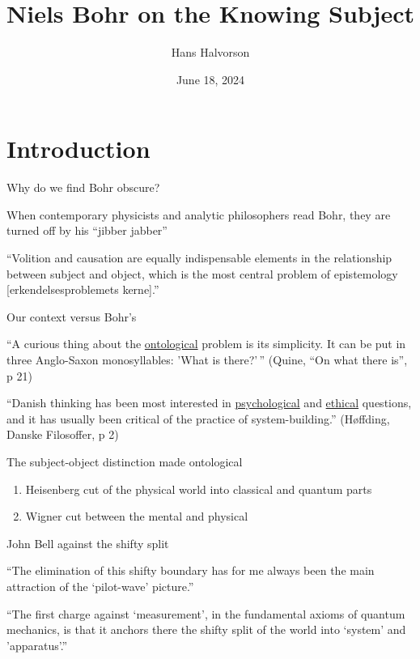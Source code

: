 \documentclass[ignorenonframetext, ]{beamer}
\title{Niels Bohr on the Knowing Subject}
\author{Hans Halvorson}
\date{June 18, 2024}
\begin{document}
\frame{\titlepage}

\section{Introduction}

\begin{frame}{Why do we find Bohr obscure?}

  When contemporary physicists and analytic philosophers read Bohr,
  they are turned off by his ``jibber jabber''

  \vfill ``Volition and causation are equally indispensable elements
  in the relationship between subject and object, which is the most
  central problem of epistemology [erkendelsesproblemets kerne].''

\end{frame}

\begin{frame}{Our context versus Bohr's}

  ``A curious thing about the \ul{ontological} problem is its
  simplicity. It can be put in three Anglo-Saxon monosyllables: 'What
  is there?'\,'' \newline (Quine, ``On what there is'', p 21)

  \bigskip \bigskip ``Danish thinking has been most interested in
  \ul{psychological} and \ul{ethical} questions, and it has usually
  been critical of the practice of system-building.'' (Høffding,
  Danske Filosoffer, p 2)

 \end{frame}


 \begin{frame}{The subject-object distinction made ontological}
   
  \begin{enumerate}
  \item Heisenberg cut of the physical world into classical and
    quantum parts
  \item Wigner cut between the mental and physical
  \end{enumerate}

\end{frame}

\begin{frame}{John Bell against the shifty split}

  ``The elimination of this shifty boundary has for me always been the
  main attraction of the `pilot-wave' picture.''

  \vfill ``The first charge against `measurement', in the fundamental
  axioms of quantum mechanics, is that it anchors there the shifty
  split of the world into `system' and 'apparatus'.''
  
\end{frame}
\end{document}
